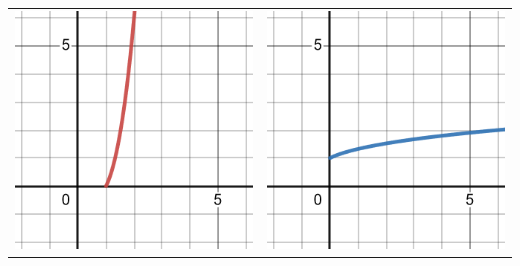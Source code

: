 \documentclass{article}
\begin{document}
\begin{enumerate}
\begin{tabular}{c c}
                  \includegraphics[scale=0.25]{M1.2.6g} & \includegraphics[scale=0.25]{M1.2.6ginv.png}
            \end{tabular}

\end{enumerate}
\end{document}
